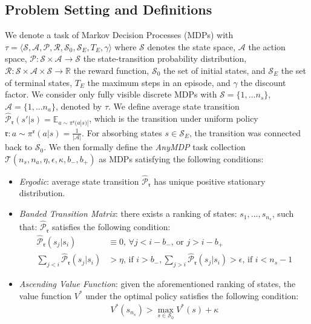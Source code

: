 \documentclass{article}
\begin{document}
\subsection{Problem Setting and Definitions}
We denote a task of Markov Decision Processes (MDPs) with $\tau =\langle \mathcal{S}, \mathcal{A}, \mathcal{P}, \mathcal{R}, \mathcal{S}_0, \mathcal{S}_E,T_E,\gamma \rangle$ where $\mathcal{S}$ denotes the state space, $\mathcal{A}$ the action space, $\mathcal{P}:\mathcal{S}\times\mathcal{A}\rightarrow\mathcal{S}$ the state-transition probability distribution, $\mathcal{R}:\mathcal{S}\times\mathcal{A}\times\mathcal{S}\rightarrow\mathbb{R}$ the reward function, $\mathcal{S}_0$ the set of initial states, and $\mathcal{S}_E$ the set of terminal states, $T_E$ the maximum steps in an episode, and $\gamma$ the discount factor. We consider only fully visible discrete MDPs with $\mathcal{S}=\{1,...n_s\}$, $\mathcal{A}=\{1,...n_a\}$, denoted by $\tau$. We define average state transition $\hat{\mathcal{P}}_{\mathfrak{r}}(s'|s) = \mathbb{E}_{a \sim \pi^{\mathfrak{r}}(a|s)|}$, which is the transition under uniform policy $\mathfrak{r}: a \sim \pi^{\mathfrak{r}}(a|s) = \frac{1}{|\mathcal{A}|}$.
For absorbing states $s \in \mathcal{S}_E$, the transition was connected back to $\mathcal{S}_0$.
We then formally define the \emph{AnyMDP} task collection $\mathcal{T}(n_s,n_a,\eta,\epsilon,\kappa, b_{-},b_{+})$ as MDPs satisfying the following conditions:
\begin{itemize}
\item \emph{Ergodic}: average state transition $\hat{\mathcal{P}}_{\mathfrak{r}}$ has unique positive stationary distribution.
\item \emph{Banded Transition Matrix}:  there exists a ranking of states: $s_1,...,s_{n_s}$, such that: $\hat{\mathcal{P}}_{\mathfrak{r}}$ satisfies the following condition:
\begin{align}
    \hat{\mathcal{P}}_\mathfrak{r}(s_j|s_i) &\equiv 0 \text{, } \forall j<i-b_{-} \text{, or } j>i-b_{+} \nonumber\\
    \sum_{j<i} \hat{\mathcal{P}}_\mathfrak{r}(s_j|s_i) &> \eta \text{, if } i>b_{-}, \sum_{j>i} \hat{\mathcal{P}}_\mathfrak{r}(s_j|s_i) > \epsilon \text{, if } i<n_s-1 \label{eq:banded_transition}
\end{align}
\item \emph{Ascending Value Function}: given the aforementioned ranking of states, the value function $V^*$ under the optimal policy satisfies the following condition: 
\begin{align}
    V^*(s_{n_s}) > \max_{s\in\mathcal{S}_0}V^*(s) + \kappa \label{eq:ascending}
\end{align}
\end{itemize}
\end{document}
